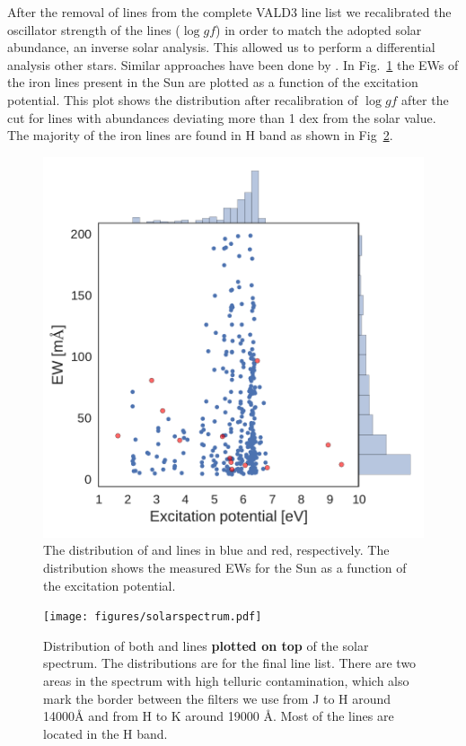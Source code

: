 \documentclass{aa}
\begin{document}
After the removal of lines from the complete VALD3 line list we
recalibrated the oscillator strength of the lines ($\log\mathit{gf}$) in
order to match the adopted solar abundance, an inverse solar analysis.
This allowed us to perform a differential analysis other stars. Similar
approaches have been done by \citet{Sousa2008a,Onehag2012,Rhodin2015}.
In Fig.~\ref{fig:EWvsEP} the EWs of the iron lines present in the Sun
are plotted as a function of the excitation potential. This plot shows
the distribution after recalibration of $\log \mathit{gf}$ after the
cut for lines with abundances deviating more than 1 dex from the solar
value. The majority of the iron lines are found in H band as shown in
Fig~\ref{fig:solarspectrum}.



\begin{figure}[tpb]
    \centering
    \includegraphics[width=1.0\linewidth]{figures/EWvsEP.pdf}
    \caption{The distribution of  and  lines
    in  blue and red, respectively. The distribution shows the
    measured EWs for the Sun as a function of the excitation potential.}
    \label{fig:EWvsEP}
\end{figure}


\begin{figure}[tpb]
    \centering
    \texttt{[image: figures/solarspectrum.pdf]}
    \caption{Distribution of both  and  lines
    \textbf{plotted on top} of the solar spectrum. The distributions are for the final
    line list. There are two areas in the spectrum with high telluric
    contamination, which also mark the border between the filters we
    use from J to H around 14000\si{\angstrom} and from H to K around
    19000 \si{\angstrom}. Most of the lines are located in the H band.}
    \label{fig:solarspectrum}
\end{figure}
\end{document}
